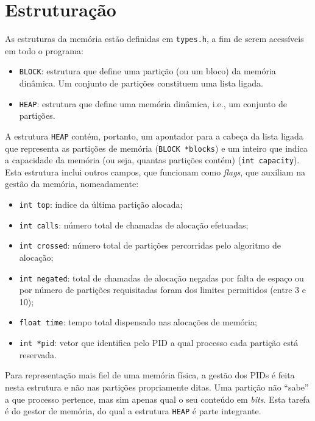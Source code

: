 \documentclass[10pt,oneside]{estiloUBI}
\begin{document}
	
	\section{Estruturação}
	\label{ssec:heap:struct}
	
	As estruturas da memória estão definidas em \verb|types.h|, a fim de serem acessíveis em todo o programa:
	\begin{itemize}
		\item \verb|BLOCK|: estrutura que define uma partição (ou um bloco) da memória dinâmica. Um conjunto de partições constituem uma lista ligada.
		\item \verb|HEAP|: estrutura que define uma memória dinâmica, i.e., um conjunto de partições.
	\end{itemize}

	A estrutura \verb|HEAP| contém, portanto, um apontador para a cabeça da lista ligada que representa as partições de memória (\texttt{BLOCK *blocks}) e um inteiro que indica a capacidade da memória (ou seja, quantas partições contém) (\texttt{int capacity}). Esta estrutura inclui outros campos, que funcionam como \textit{flags}, que auxiliam na gestão da memória, nomeadamente:
	
	\begin{itemize}
		\item \texttt{int top}: índice da última partição alocada;
		\item \texttt{int calls}: número total de chamadas de alocação efetuadas;
		\item \texttt{int crossed}: número total de partições percorridas pelo algoritmo de alocação;
		\item \texttt{int negated}: total de chamadas de alocação negadas por falta de espaço ou por número de partições requisitadas foram dos limites permitidos (entre 3 e 10);
		\item \texttt{float time}: tempo total dispensado nas alocações de memória;
		\item \texttt{int *pid}: vetor que identifica pelo \ac{PID} a qual processo cada partição está reservada.
	\end{itemize}

	Para representação mais fiel de uma memória física, a gestão dos \ac{PID}s é feita nesta estrutura e não nas partições propriamente ditas. Uma partição não ``sabe'' a que processo pertence, mas sim apenas qual o seu conteúdo em \textit{bits}. Esta tarefa é do gestor de memória, do qual a estrutura \verb|HEAP| é parte integrante.
	
\end{document}
